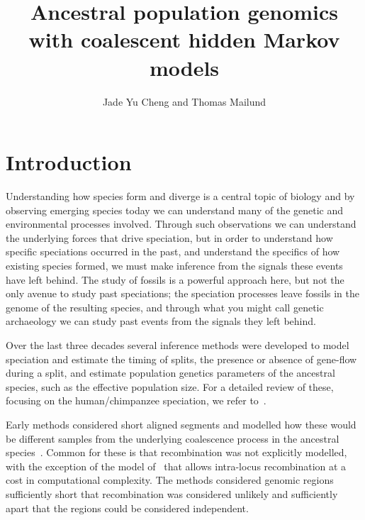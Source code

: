 \documentclass[graybox]{svmult}
\begin{document}
\title*{Ancestral population genomics with coalescent hidden Markov models}
\author{Jade Yu Cheng and Thomas Mailund}
\maketitle



\section{Introduction}

Understanding how species form and diverge is a central topic of biology and by observing emerging species today we can understand many of the genetic and environmental processes involved. Through such observations we can understand the underlying forces that drive speciation, but in order to understand how specific speciations occurred in the past, and understand the specifics of how existing species formed, we must make inference from the signals these events have left behind. The study of fossils is a powerful approach here, but not the only avenue to study past speciations; the speciation processes leave fossils in the genome of the resulting species, and through what you might call genetic archaeology we can study past events from the signals they left behind.

Over the last three decades several inference methods were developed to model speciation and estimate the timing of splits, the presence or absence of gene-flow during a split, and estimate population genetics parameters of the ancestral species, such as the effective population size. For a detailed review of these, focusing on the human/chimpanzee speciation, we refer to~\citet{Mailund:2014fyb}.

Early methods considered short aligned segments and modelled how these would be different samples from the underlying coalescence process in the ancestral species~\cite{Takahata:1995kl, Innan:2006hc, Burgess:2008kf, Rannala:2003vt, Yang:2002wz, Yang:2006eu, Yang:2010fm, Becquet:2009hta, Chen:2001dka, Wall:2003vb}. Common for these is that recombination was not explicitly modelled, with the exception of the model of~\citet{Becquet:2009hta} that allows intra-locus recombination at a cost in computational complexity. The methods considered genomic regions sufficiently short that recombination was considered unlikely and sufficiently apart that the regions could be considered independent.
\end{document}
